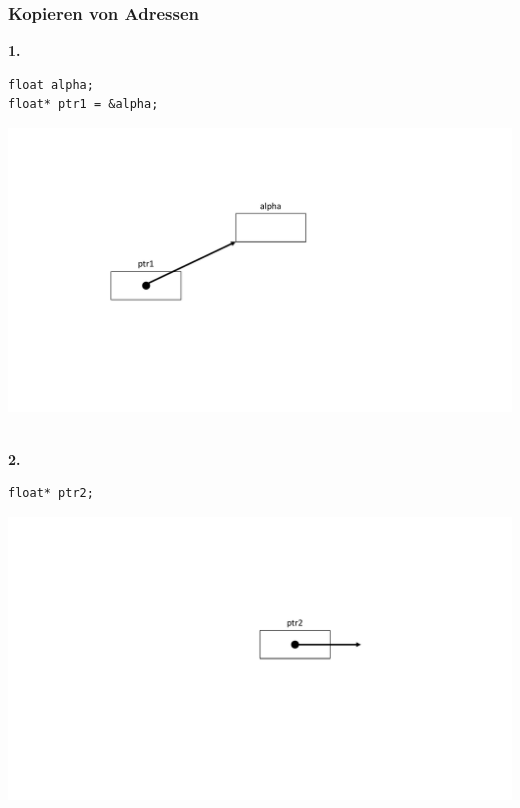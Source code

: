 \subsubsection{Kopieren von Adressen}
\Large{\textbf{1.}}\normalsize\\
\noindent
\begin{minipage}{0.25\linewidth}
\begin{lstlisting}
float alpha;
float* ptr1 = &alpha;
\end{lstlisting}
\end{minipage}
\hspace{0.01\linewidth}
\begin{minipage}{0.3\linewidth}
	\includegraphics[width=\linewidth]{images/pointer4.pdf}
\end{minipage}\\

\Large{\textbf{2.}}\normalsize\\
\noindent
\begin{minipage}{0.25\linewidth}
\begin{lstlisting}
float* ptr2;
\end{lstlisting}
\end{minipage}
\hspace{0.01\linewidth}
\begin{minipage}{0.2\linewidth}
	\centering
	\includegraphics[width=\linewidth]{images/pointer5.pdf}
\end{minipage}\\

